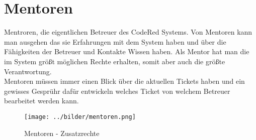 \chapter{Mentoren}  %
\label{chapter:Mentoren}  %

Mentroren, die eigentlichen Betreuer des CodeRed Systems. Von Mentoren kann man ausgehen das sie Erfahrungen mit dem System haben und über die Fähigkeiten der Betreuer und Kontakte Wissen haben. Als Mentor hat man die im System größt möglichen Rechte erhalten, somit aber auch die größte Verantwortung.\\
Mentoren müssen immer einen Blick über die aktuellen Tickets haben und ein gewisses Gesprühr dafür entwickeln welches Ticket von welchem Betreuer bearbeitet werden kann.\\
\vspace{2cm}
\begin{figure}[h]
\begin{center}
   \texttt{[image: ../bilder/mentoren.png]}
   \caption{Mentoren - Zusatzrechte}
   \label{Mentoren - Zusatzrechte}
\end{center}
\end{figure}
